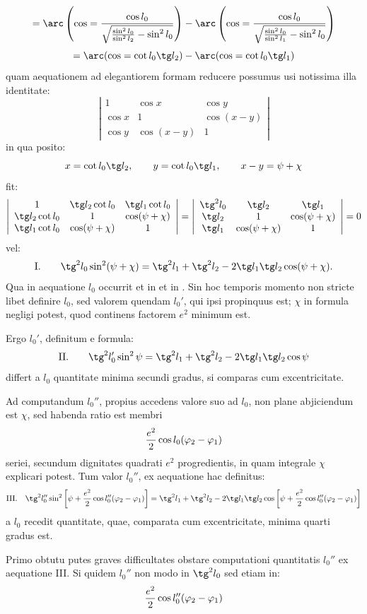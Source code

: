 \begingroup\small
\[
=\arc\left(\cos={\cos l_0\over\sqrt{{\sin^2l_0\over\sin^2l_2}-\sin^2l_0}}\right)-\arc\left(\cos={\cos l_0\over\sqrt{{\sin^2l_0\over\sin^2l_1}-\sin^2l_0}}\right)
\]
\[
=\arc(\cos=\cot l_0\tg l_2)-\arc(\cos=\cot l_0\tg l_1)
\]
quam aequationem ad elegantiorem formam reducere possumus usi notissima illa identitate:
\[
\left|\begin{array}{ccc}
1&\cos x&\cos y\\
\cos x&1&\cos(x-y)\\
\cos y&\cos(x-y)&1
\end{array}\right|
\]
in qua posito:
\[
 x=\cot l_0\tg l_2,
 \qquad y=\cot l_0\tg l_1,
 \qquad x-y=\psi+\chi
\]
fit:
\[
\left|\begin{array}{ccc}
1&\tg l_2\cot l_0&\tg l_1\cot l_0\\
\tg l_2\cot l_0&1&\cos(\psi+\chi)\\
\tg l_1\cot l_0&\cos(\psi+\chi)&1
\end{array}\right|
=
\left|\begin{array}{ccc}
\tg^2l_0&\tg l_2&\tg l_1\\
\tg l_2&1&\cos(\psi+\chi)\\
\tg l_1&\cos(\psi+\chi)&1
\end{array}\right|=0
\]
vel:
\[
\text{I.}\qquad \tg^2l_0\sin^2(\psi+\chi)=\tg^2l_1+\tg^2l_2-2\tg l_1\tg l_2\cos(\psi+\chi).
\]
Qua in aequatione $l_0$ occurrit et in  et in \gq{$\chi$}. Sin hoc temporis momento non stricte libet definire $l_0$, sed valorem quendam $l_0'$, qui ipsi propinquus est; $\chi$ in formula negligi potest, quod continens factorem $e^2$ minimum est.

Ergo $l_0'$, definitum e formula:
\[
\text{II.}\qquad \tg^2l_0'\sin^2\psi=\tg^2l_1+\tg^2l_2-2\tg l_1\tg l_2\cos\psi
\]
differt a $l_0$ quantitate minima secundi gradus, si comparas cum excentricitate.

Ad computandum $l_0''$, propius accedens valore suo ad $l_0$, non plane abjiciendum est $\chi$, sed habenda ratio est membri
\[
 {e^2\over2}\cos l_0(\varphi_2-\varphi_1)
\]
seriei, secundum dignitates quadrati $e^2$ progredientis, in quam integrale $\chi$ explicari potest.
Tum valor $l_0''$, ex aequatione hac definitus:
\[
\text{III.}\quad \tg^2l_0''\sin^2\left[\psi+{e^2\over2}\cos l_0''(\varphi_2-\varphi_1)\right]
=\tg^2l_1+\tg^2l_2-2\tg l_1\tg l_2\cos\left[\psi+{e^2\over2}\cos l_0''(\varphi_2-\varphi_1)\right]
\]
a $l_0$ recedit quantitate, quae, comparata cum excentricitate, minima quarti gradus est.

Primo obtutu putes graves difficultates obstare computationi quantitatis $l_0''$ ex aequatione III. Si quidem $l_0''$ non modo in $\tg^2l_0$ sed etiam in:
\[
 {e^2\over2}\cos l_0''(\varphi_2-\varphi_1)
\]
\endgroup
